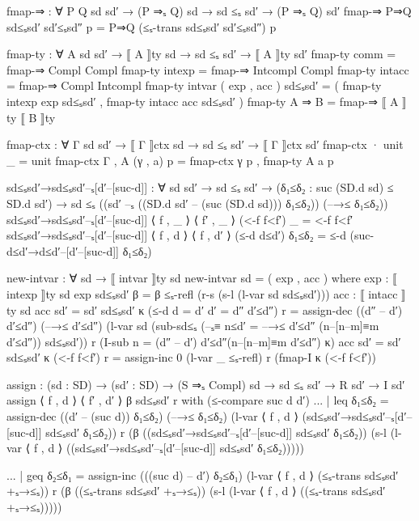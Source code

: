 \documentclass{article}
\begin{document}
\begin{prev}
\begin{code}
fmap-⇒ : ∀ {P Q sd sd′} → (P ⇒ₛ Q) sd → sd ≤ₛ sd′ → (P ⇒ₛ Q) sd′
fmap-⇒ P⇒Q sd≤ₛsd′ sd′≤ₛsd″ p = P⇒Q (≤ₛ-trans sd≤ₛsd′ sd′≤ₛsd″) p

fmap-ty : ∀ {A sd sd′} → ⟦ A ⟧ty sd → sd ≤ₛ sd′ → ⟦ A ⟧ty sd′
fmap-ty {comm}  = fmap-⇒ {Compl} {Compl}
fmap-ty {intexp} = fmap-⇒ {Intcompl} {Compl}
fmap-ty {intacc} = fmap-⇒ {Compl} {Intcompl}
fmap-ty {intvar} ( exp , acc ) sd≤ₛsd′ = 
    ( fmap-ty {intexp} exp sd≤ₛsd′ , fmap-ty {intacc} acc sd≤ₛsd′ )
fmap-ty {A ⇒ B} = fmap-⇒ {⟦ A ⟧ty} {⟦ B ⟧ty}

fmap-ctx : ∀ {Γ sd sd′} → ⟦ Γ ⟧ctx sd → sd ≤ₛ sd′ → ⟦ Γ ⟧ctx sd′
fmap-ctx {·} unit _ = unit
fmap-ctx {Γ , A} (γ , a) p = fmap-ctx γ p , fmap-ty {A} a p


sd≤ₛsd′→sd≤ₛsd′–ₛ[d′–[suc-d]] : ∀ {sd sd′} → sd ≤ₛ sd′ 
    → (δ₁≤δ₂ : suc (SD.d sd) ≤ SD.d sd′) 
    → sd ≤ₛ ((sd′ –ₛ ((SD.d sd′ – (suc (SD.d sd))) δ₁≤δ₂)) (–→≤ δ₁≤δ₂))
sd≤ₛsd′→sd≤ₛsd′–ₛ[d′–[suc-d]] {⟨ f , _ ⟩} {⟨ f′ , _ ⟩} (<-f f<f′) _ 
    = <-f f<f′
sd≤ₛsd′→sd≤ₛsd′–ₛ[d′–[suc-d]] {⟨ f , d ⟩} {⟨ f , d′ ⟩} (≤-d d≤d′) δ₁≤δ₂ 
    = ≤-d (suc-d≤d′→d≤d′–[d′–[suc-d]] δ₁≤δ₂)

new-intvar : ∀ sd → ⟦ intvar ⟧ty sd
new-intvar sd = ( exp , acc )
    where
        exp : ⟦ intexp ⟧ty sd
        exp sd≤ₛsd′ β = β ≤ₛ-refl (r-s (s-l (l-var sd sd≤ₛsd′)))
        acc : ⟦ intacc ⟧ty sd
        acc {sd′ = sd′} sd≤ₛsd′ κ (≤-d {d = d′} {d′ = d″} d′≤d″) r
            = assign-dec 
                ((d″ – d′) d′≤d″) (–→≤ d′≤d″) 
                (l-var sd
                   (sub-sd≤ₛ (–ₛ≡ {n≤d′ = –→≤ d′≤d″} (n–[n–m]≡m d′≤d″)) sd≤ₛsd′))
                r
                (I-sub {n = (d″ – d′) d′≤d″}(n–[n–m]≡m d′≤d″) κ)
        acc {sd′ = sd′} sd≤ₛsd′ κ (<-f f<f′) r 
            = assign-inc 0 (l-var _ ≤ₛ-refl) r (fmap-I κ (<-f f<f′))


assign : (sd : SD) → (sd′ : SD) → (S ⇒ₛ Compl) sd 
            → sd ≤ₛ sd′ → R sd′ → I sd′
assign ⟨ f , d ⟩ ⟨ f′ , d′ ⟩ β sd≤ₛsd′ r with (≤-compare {suc d} {d′})
... | leq δ₁≤δ₂ 
        = assign-dec 
            ((d′ – (suc d)) δ₁≤δ₂) (–→≤ δ₁≤δ₂) 
              (l-var ⟨ f , d ⟩ 
                (sd≤ₛsd′→sd≤ₛsd′–ₛ[d′–[suc-d]] sd≤ₛsd′ δ₁≤δ₂)) 
              r 
              (β ((sd≤ₛsd′→sd≤ₛsd′–ₛ[d′–[suc-d]] sd≤ₛsd′ δ₁≤δ₂)) 
                (s-l (l-var ⟨ f , d ⟩ 
                  ((sd≤ₛsd′→sd≤ₛsd′–ₛ[d′–[suc-d]] sd≤ₛsd′ δ₁≤δ₂)))))


... | geq δ₂≤δ₁ = assign-inc (((suc d) – d′) δ₂≤δ₁) 
                  (l-var ⟨ f , d ⟩ (≤ₛ-trans sd≤ₛsd′ +ₛ→≤ₛ)) r 
                  (β ((≤ₛ-trans sd≤ₛsd′ +ₛ→≤ₛ)) 
                    (s-l (l-var ⟨ f , d ⟩ ((≤ₛ-trans sd≤ₛsd′ +ₛ→≤ₛ)))))


\end{code}
\end{prev}
\end{document}
